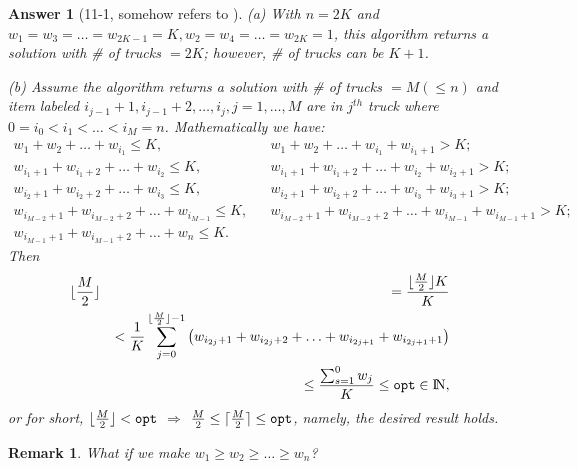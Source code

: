 \documentclass[11pt]{article}
\newcommand {\Naturals}  {{\rm I \! N}}
\theoremstyle{numberplain}
\theoremstyle{nonumberplain}
\newtheorem{rem}{Remark}
\newtheorem{ans}{Answer}
\newcommand{\0}{{\mathbf{0}}}
\begin{document}
\begin{ans}[11-1, somehow refers to \cite{solcornell}] (a) With $n=2K$ and $w_1=w_3=\ldots=w_{2K-1}=K,w_2=w_4=\ldots=w_{2K}=1$, this algorithm returns a solution with \# of trucks $=2K$; however, \# of trucks can be $K+1$.

(b) Assume the algorithm returns a solution with \# of trucks $=M(\leq n)$ and item labeled $i_{j-1}+1,i_{j-1}
+2, \ldots,i_j ,j=1,\ldots,M$ are in $j^{th}$ truck where $0=i_0<i_1<\ldots<i_M=n$. Mathematically we have:
\begin{eqnarray*}
w_1+w_2+\ldots +w_{i_1}\leq K, && w_1+w_2+\ldots +w_{i_1}+w_{i_1+1}>K ; \\
w_{i_1+1}+w_{i_1+2}+\ldots +w_{i_2}\leq K, && w_{i_1+1}+w_{i_1+2}+\ldots +w_{i_2}+w_{i_2+1}>K ; \\
w_{i_2+1}+w_{i_2+2}+\ldots +w_{i_3}\leq K, && w_{i_2+1}+w_{i_2+2}+\ldots +w_{i_3}+w_{i_3+1}>K ; \\
w_{i_{M-2}+1}+w_{i_{M-2}+2}+\ldots +w_{i_{M-1}}\leq K, && w_{i_{M-2}+1}+w_{i_{M-2}+2}+\ldots +w_{i_{M-1}}+w_{i_{M-1}+1}>K ; \\
w_{i_{M-1}+1}+w_{i_{M-1}+2}+\ldots +w_n\leq K.
\end{eqnarray*}
Then 
\begin{eqnarray*}
\lfloor\frac{M}{2}\rfloor && =\frac{\lfloor\frac{M}{2}\rfloor K}{K} \\
&&<  \frac{1}{K}\sum_{j=0}^{\lfloor\frac{M}{2}\rfloor -1}\left(w_{i_{2j}+1}+w_{i_{2j}+2}+\ldots +w_{i_{2j+1}}+w_{i_{2j+1}+1}\right) \\
&& \leq \frac{\sum_{s=1}^{0}w_j}{K} \leq {\tt opt} \in \Naturals,
\end{eqnarray*}
or for short, $\lfloor\frac{M}{2}\rfloor<{\tt opt}$ $\Rightarrow$ $\frac{M}{2}\leq \lceil \frac{M}{2}\rceil\leq{\tt opt}$, namely, the desired result holds.
\end{ans}

\begin{rem} What if we make $w_1\geq w_2\geq \ldots\geq w_n$? 
\end{rem}
\end{document}
